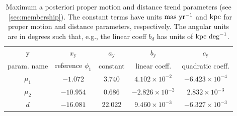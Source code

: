 \documentclass[twocolumn]{aastex63}
\begin{document}
\begin{table}
\begin{center}
\caption{Maximum a posteriori proper motion and distance trend parameters (see \sectionname~\ref{sec:membership}). The constant terms have units $\mathrm{mas}~\mathrm{yr}^{-1}$ and $\mathrm{kpc}$ for proper motion and distance parameters, respectively. The angular units are in degrees such that, e.g., the linear coeff $b_d$ has units of $\mathrm{kpc}~\textrm{deg}^{-1}$.}\label{t:trendpars}
\begin{footnotesize}
\begin{tabular}{c c c c c}
\toprule
y & $x_{\textrm{y}}$ & $a_\textrm{y}$ & $b_\textrm{y}$ & $c_\textrm{y}$\\
param. name & reference $\phi_1$ & constant & linear coeff. & quadratic coeff.\\
\midrule
$\mu_1$ &  $-1.072$ & 3.740  & $4.102 \times 10^{-2}$  & $-6.423 \times 10^{-4}$ \\
$\mu_2$ & $-10.954$ & 0.686  & $-2.826 \times 10^{-2}$ & $2.832 \times 10^{-3}$ \\
$d$     & $-16.081$ & 22.022 & $9.460 \times 10^{-3}$  & $-6.327 \times 10^{-3}$\\
\bottomrule
\end{tabular}
\end{footnotesize}
\end{center}
\end{table}
\end{document}
